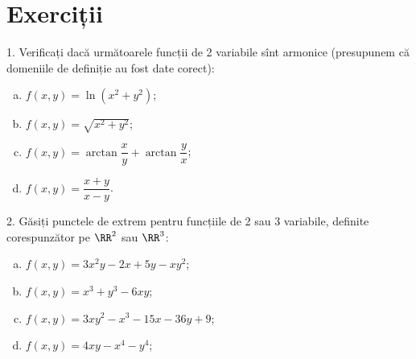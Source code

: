 \section{Exerciții}

1. Verificați dacă următoarele funcții de 2 variabile sînt armonice (presupunem
că domeniile de definiție au fost date corect):
\begin{enumerate}[(a)]
\item $ f(x, y) = \ln(x^2 + y^2) $;
\item $ f(x, y) = \sqrt{x^2 + y^2} $;
\item $ f(x, y) = \arctan \dfrac{x}{y} + \arctan\dfrac{y}{x} $;
\item $ f(x, y) = \dfrac{x + y}{x - y} $.
\end{enumerate}

\vspace{1cm}

2. Găsiți punctele de extrem pentru funcțiile de 2 sau 3 variabile, definite
corespunzător pe $ \RR^2 $ sau $ \RR^3 $:
\begin{enumerate}[(a)]
\item $ f(x, y) = 3x^2y - 2x + 5y - xy^2 $;
\item $ f(x, y) = x^3 + y^3 - 6xy $;
\item $ f(x, y) = 3xy^2 - x^3 - 15x - 36y + 9 $;
\item $ f(x, y) = 4xy - x^4 - y^4 $;
\end{enumerate}

